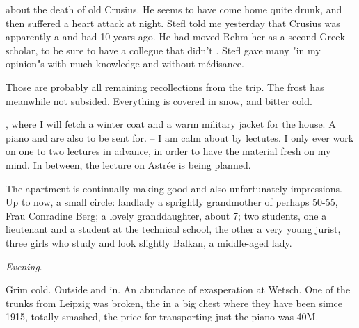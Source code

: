   about the death of old Crusius. He seems to have come home quite drunk, and then suffered a heart attack at night. Stefl told me yesterday that Crusius was apparently a  and had  10 years ago. He had moved Rehm her as a second Greek scholar, to be sure to have a collegue that didn't . Stefl gave many "in my opinion"s with much knowledge and without médisance. --

Those are probably all remaining recollections from the trip. The frost has meanwhile not subsided. Everything is covered in snow, and bitter cold.

, where I will fetch a winter coat and a warm military jacket for the house. A piano and  are also to be sent for. -- I am calm about by lectutes. I only ever work on one to two lectures in advance, in order to have the material fresh on my mind. In between, the lecture on Astrée is being planned.

\missing

The apartment is continually making good and also unfortunately  impressions. Up to now, a small circle: landlady a sprightly grandmother of perhaps 50-55, Frau Conradine Berg; a lovely granddaughter, about 7; two students, one a lieutenant and a student at the technical school, the other a very young jurist, three girls who study and look slightly Balkan, a middle-aged lady.

\textit{Evening}.

Grim cold. Outside and in. An abundance of exasperation at Wetsch. One of the trunks from Leipzig was broken, the  in a big chest where they have been simce 1915, totally smashed, the price for transporting just the piano was 40M. --

\missing


